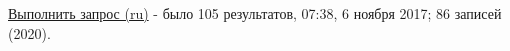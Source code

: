 \href{https://query.wikidata.org/#%23List%20of%20ship%20with%20countries%20and%20war%20conflicts%20in%20Russian%0ASELECT%20%3Fship%20%3FshipLabel%20%3FcountryLabel%20%3Fconflict%20%3FconflictLabel%0AWHERE%0A%7B%0A%20%20%3Fship%20wdt%3AP31%20wd%3AQ11446%3B%20%20%20%20%20%20%20%20%23%20instance%20of%20ship%0A%20%20%20%20%20%20%20%20wdt%3AP137%2Fwdt%3AP17%20%3Fcountry%3B%20%20%20%20%20%20%20%20%23%20belongs%20to%20operator%0A%20%20%20%20%20%20%20%20wdt%3AP607%20%3Fconflict.%20%20%20%20%20%20%20%23%20engaged%20in%20some%20conflict%0A%20%20%0A%20%20%7B%20%3Fcountry%20wdt%3AP17%20wd%3AQ34266%20%7D%20UNION%20%20%23%20Russian%20Empire%0A%20%20%7B%20%3Fcountry%20wdt%3AP17%20wd%3AQ15180%20%7D%20UNION%20%20%23%20Soviet%20Union%0A%20%20%7B%20%3Fcountry%20wdt%3AP17%20wd%3AQ159%20%7D.%20%20%20%20%20%20%20%20%20%23%20Russia%0A%20%20%0A%20%20SERVICE%20wikibase%3Alabel%20%7B%20bd%3AserviceParam%20wikibase%3Alanguage%20"ru".%20%7D%0A%7D}{Выполнить запрос (ru)} - было 105 результатов, 07:38, 6 ноября 2017; 86 записей (2020).